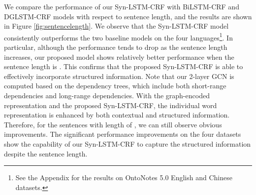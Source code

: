 \documentclass[11pt]{article}
\begin{document}
We compare the performance of our Syn-LSTM-CRF with BiLSTM-CRF and DGLSTM-CRF models with respect to sentence length, and the results are shown in Figure \ref{fig:sentencelength}. 
We observe that the Syn-LSTM-CRF model consistently outperforms the two baseline models on the four languages\footnote{See the Appendix for the results on  OntoNotes 5.0 English and Chinese datasets.}. 
In particular, although the performance tends to drop as the sentence length increases, our proposed model shows relatively better performance when the sentence length is .  This confirms that the proposed Syn-LSTM-CRF is able to effectively incorporate structured information. Note that our 2-layer GCN is computed based on the dependency trees, which include both short-range dependencies and long-range dependencies. With the graph-encoded representation and the proposed Syn-LSTM-CRF, the individual word representation is enhanced by both contextual and structured information. Therefore, for the sentences with length of , we can still observe obvious improvements. 
The significant performance improvements on the four datasets show the capability of our Syn-LSTM-CRF to capture the structured information despite the sentence length.











	
	
\end{document}

